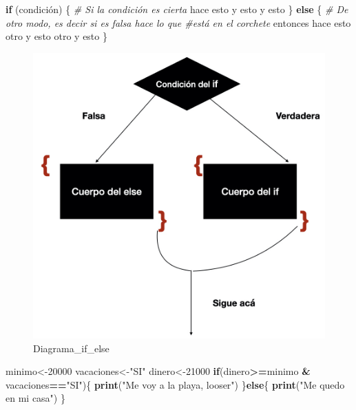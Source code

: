 \documentclass[
]{book}
\newenvironment{Shaded}{\begin{snugshade}}{\end{snugshade}}
\newcommand{\CommentTok}[1]{\textcolor[rgb]{0.56,0.35,0.01}{\textit{#1}}}
\newcommand{\ControlFlowTok}[1]{\textcolor[rgb]{0.13,0.29,0.53}{\textbf{#1}}}
\newcommand{\DecValTok}[1]{\textcolor[rgb]{0.00,0.00,0.81}{#1}}
\newcommand{\FunctionTok}[1]{\textcolor[rgb]{0.13,0.29,0.53}{\textbf{#1}}}
\newcommand{\NormalTok}[1]{#1}
\newcommand{\OtherTok}[1]{\textcolor[rgb]{0.56,0.35,0.01}{#1}}
\newcommand{\SpecialCharTok}[1]{\textcolor[rgb]{0.81,0.36,0.00}{\textbf{#1}}}
\newcommand{\StringTok}[1]{\textcolor[rgb]{0.31,0.60,0.02}{#1}}
\begin{document}
\begin{Shaded}
\begin{Highlighting}[]
\ControlFlowTok{if}\NormalTok{ (condición) \{ }\CommentTok{\# Si la condición es cierta}
\NormalTok{hace esto}
\NormalTok{y esto}
\NormalTok{y esto}
\NormalTok{\} }\ControlFlowTok{else}\NormalTok{ \{ }\CommentTok{\# De otro modo, es decir si es falsa hace lo que \#está en el corchete}
\NormalTok{entonces hace esto otro}
\NormalTok{y esto otro}
\NormalTok{y esto}
\NormalTok{\}}
\end{Highlighting}
\end{Shaded}

\begin{figure}
\hypertarget{id}{%
\centering
\includegraphics[width=1\textwidth,height=1\textheight]{If_else.001.jpeg}
\caption{Diagrama\_if\_else}\label{id}
}
\end{figure}

\begin{Shaded}
\begin{Highlighting}[]
\NormalTok{minimo}\OtherTok{\textless{}{-}}\DecValTok{20000}
\NormalTok{vacaciones}\OtherTok{\textless{}{-}}\StringTok{"SI"}
\NormalTok{dinero}\OtherTok{\textless{}{-}}\DecValTok{21000}
\ControlFlowTok{if}\NormalTok{(dinero}\SpecialCharTok{\textgreater{}=}\NormalTok{minimo }\SpecialCharTok{\&}\NormalTok{ vacaciones}\SpecialCharTok{==}\StringTok{"SI"}\NormalTok{)\{}
  \FunctionTok{print}\NormalTok{(}\StringTok{"Me voy a la playa, looser"}\NormalTok{)}
\NormalTok{\}}\ControlFlowTok{else}\NormalTok{\{}
  \FunctionTok{print}\NormalTok{(}\StringTok{"Me quedo en mi casa"}\NormalTok{)}
\NormalTok{\}}
\end{Highlighting}
\end{Shaded}
\end{document}
